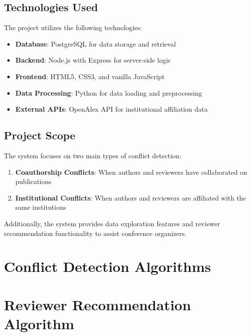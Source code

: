 \documentclass[12pt,a4paper]{article}
\begin{document}
\subsection{Technologies Used}
The project utilizes the following technologies:
\begin{itemize}
    \item \textbf{Database}: PostgreSQL for data storage and retrieval
    \item \textbf{Backend}: Node.js with Express for server-side logic
    \item \textbf{Frontend}: HTML5, CSS3, and vanilla JavaScript
    \item \textbf{Data Processing}: Python for data loading and preprocessing
    \item \textbf{External APIs}: OpenAlex API for institutional affiliation data
\end{itemize}

\subsection{Project Scope}
The system focuses on two main types of conflict detection:
\begin{enumerate}
    \item \textbf{Coauthorship Conflicts}: When authors and reviewers have collaborated on publications
    \item \textbf{Institutional Conflicts}: When authors and reviewers are affiliated with the same institutions
\end{enumerate}

Additionally, the system provides data exploration features and reviewer recommendation functionality to assist conference organizers.

\newpage

\newpage

\section{Conflict Detection Algorithms}


\section{Reviewer Recommendation Algorithm}


\newpage

\end{document}
